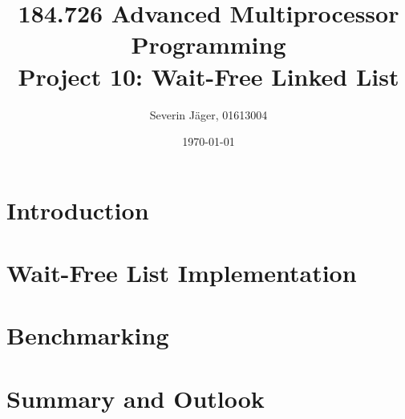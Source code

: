 \documentclass[a4paper, 12t]{article}
\title{184.726 Advanced Multiprocessor Programming\\
	   Project 10: Wait-Free Linked List}
\author{
  Severin Jäger, 01613004
}
\date{\today}
\begin{document}
\maketitle
\tableofcontents
\pagebreak

\section{Introduction}
\cite{timnat12}
\cite{harris01}
\cite{herlihy12}

\section{Wait-Free List Implementation}



\section{Benchmarking}


\section{Summary and Outlook}

\sloppy
\printbibliography
\end{document}
